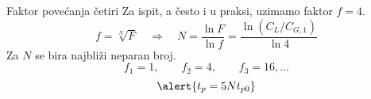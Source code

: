 \begin{frame}[label=09_3-s022]{Faktor povećanja četiri}
Za ispit, a često i u praksi, uzimamo faktor $f=4$.
\[f=\sqrt[N]F\quad\Longrightarrow\quad
N=\frac{\ln F}{\ln f}=\frac{\ln(C_L/C_{G,1})}{\ln4}\]
Za $N$ se bira najbliži neparan broj.
\[f_1=1,\qquad f_2=4,\qquad f_3=16,\ldots\]
\[\alert{t_p=5Nt_{p0}}\]
\end{frame}
